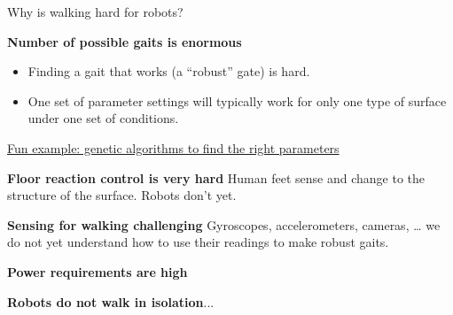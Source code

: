 \documentclass[compress]{beamer}
\begin{document}

\begin{frame}{Why is walking hard for robots?}

    \textbf{Number of possible gaits is enormous}

    \begin{itemize}

        \item Finding a gait that works (a ``robust'' gate) is hard.
        \item One set of parameter settings will typically work for only one type of
            surface under one set of conditions.
    \end{itemize}

    \href{http://rednuht.org/genetic_walkers/}{Fun example: genetic algorithms
    to find the right parameters}

    \pause
    \textbf{Floor reaction control is very hard} Human feet sense and change to the structure of the surface. Robots
            don't yet.

    \pause
    \textbf{Sensing for walking challenging} Gyroscopes, accelerometers, cameras, \ldots{} we do not yet understand
            how to use their readings to make robust gaits.

    \pause
    \textbf{Power requirements are high}

    \pause
    \textbf{Robots do not walk in isolation}...

\end{frame}

\end{document}
